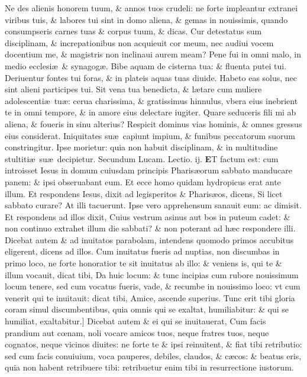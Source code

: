 \documentclass[a5paper,10pt]{book}
\def\rightmarginnote{%
	\lrmarginnote{\hskip\columnwidth \hskip -1em}}
\def\ae{æ}
\def\oe{œ}
\begin{document}
\begin{multicols*}{2}
Ne des alienis honorem tuum, \& annos tuos crudeli: ne forte impleantur extranei viribus tuis, \& labores tui sint in domo aliena, \& gemas in nouissimis, quando consumpseris carnes tuas \& corpus tuum, \& dicas.
Cur detestatus sum disciplinam, \& increpationibus non acquieuit cor meum, nec audiui vocem docentium me, \& magistris non inclinaui aurem meam?
Pene fui in omni malo, in medio ecclesi\ae \ \& synagog\ae . Bibe aquam de cisterna tua: \& fluenta putei tui.
Deriuentur fontes tui foras, \& in plateis aquas tuas diuide. Habeto eas solus, nec sint alieni participes tui.
Sit vena tua benedicta, \& l\ae tare cum muliere adolescenti\ae \ tu\ae : cerua charissima, \& gratissimus hinnulus, vbera eius inebrient te in omni tempore, \& in amore eius delectare iugiter.
Quare seduceris fili mi ab aliena, \& foueris in sinu alterius?
Respicit dominus vias hominis, \& omnes gressus eius considerat.
Iniquitates su\ae \ capiunt impium, \& funibus peccatorum suorum constringitur.
Ipse morietur: quia non habuit disciplinam, \& in multitudine stultiti\ae \ su\ae \ decipietur.
\fancyhead[C]{\color{red} Sabbato Dominic\ae . j. post aduentum}
\newline \color{red} Secundum Lucam. \hfill Lectio. ij. \color{black}
\vspace{-.25em}
\lettrine[lines=2]{\bfseries \color{red} E}{}T\rightmarginnote{c. 14.\\a} factum est: cum introisset Iesus in domum cuiusdam principis Pharis\ae orum sabbato manducare panem: \& ipsi
obseruabant eum.
Et ecce homo quidam hydropicus erat ante illum. Et respondens Iesus, dixit ad legisperitos \& Pharis\ae os, dicens, Si licet sabbato curare?
At illi tacuerunt. Ipse vero apprehensum sanauit eum: ac dimisit.
Et respondens ad illos dixit, Cuius vestrum asinus aut bos in puteum cadet: \& non continuo extrahet illum die sabbati? \& non poterant ad h\ae c respondere illi.
Dicebat autem \& ad inuitatos parabolam, intendens quomodo primos accubitus eligerent, dicens ad illos.
Cum inuitatus fueris ad nuptias, non discumbas in primo loco, ne forte honoratior te sit inuitatus ab illo: \& veniens is, qui te \& illum vocauit, dicat tibi, Da huic locum: \& tunc incipias cum rubore nouissimum locum tenere, sed cum vocatus fueris, vade, \& recumbe in nouissimo loco: vt cum venerit qui te inuitauit: dicat tibi, Amice, ascende superius.
Tunc erit tibi gloria coram simul discumbentibus, quia omnis qui se exaltat, humiliabitur: \& qui se humiliat, exaltabitur.]
Dicebat\rightmarginnote{B} autem \& ei qui se inuitauerat, Cum facis prandium aut c\oe nam, noli vocare amicos tuos, neque fratres tuos, neque cognatos, neque vicinos diuites: ne forte te \& ipsi reinuitent, \& fiat tibi retributio: sed cum facis conuiuium, voca pauperes, debiles, claudos, \& c\ae cos: \& beatus eris, quia non habent retribuere tibi: retribuetur enim tibi in resurrectione iustorum.

\end{multicols*}
\end{document}
